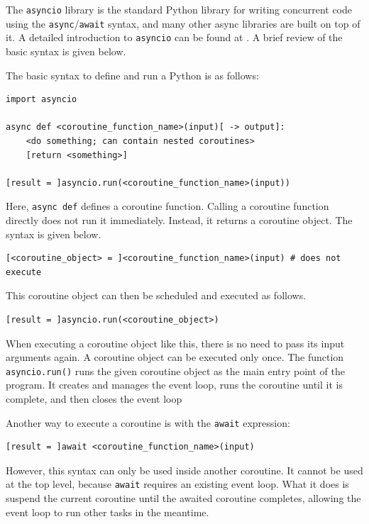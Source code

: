 The \verb|asyncio| library is the standard Python library for writing concurrent code using the \verb|async|/\verb|await| syntax, and many other async libraries are built on top of it. A detailed introduction to \verb|asyncio| can be found at \cite{python2025asyncio}. A brief review of the basic syntax is given below.

The basic syntax to define and run a Python  is as follows:
\begin{lstlisting}
import asyncio

async def <coroutine_function_name>(input)[ -> output]:
    <do something; can contain nested coroutines>
    [return <something>]
    
[result = ]asyncio.run(<coroutine_function_name>(input))
\end{lstlisting}
Here, \texttt{async def} defines a coroutine function. Calling a coroutine function directly does not run it immediately. Instead, it returns a coroutine object. The syntax is given below.
\begin{lstlisting}
[<coroutine_object> = ]<coroutine_function_name>(input) # does not execute
\end{lstlisting}
This coroutine object can then be scheduled and executed as follows.
\begin{lstlisting}
[result = ]asyncio.run(<coroutine_object>)
\end{lstlisting}
When executing a coroutine object like this, there is no need to pass its input arguments again. A coroutine object can be executed only once. The function \texttt{asyncio.run()} runs the given coroutine object as the main entry point of the program. It creates and manages the event loop, runs the coroutine until it is complete, and then closes the event loop

Another way to execute a coroutine is with the \verb|await| expression:
\begin{lstlisting}
[result = ]await <coroutine_function_name>(input)
\end{lstlisting}
However, this syntax can only be used inside another coroutine. It cannot be used at the top level, because \verb|await| requires an existing event loop. What it does is suspend the current coroutine until the awaited coroutine completes, allowing the event loop to run other tasks in the meantime.

